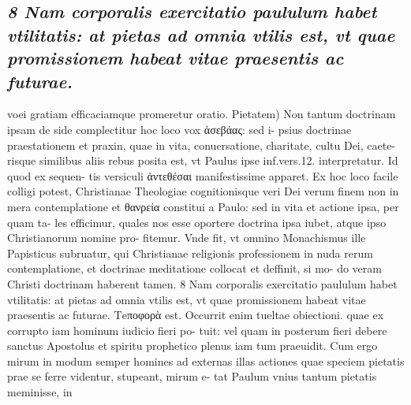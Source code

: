 \documentclass{article}
\begin{document}
\begin{pages}
\subsection*{\textit{8 Nam corporalis exercitatio paululum habet vtilitatis: at pietas ad omnia vtilis est, vt quae promissionem habeat vitae praesentis ac futurae.}}voei gratiam efficaciamque promeretur oratio. Pietatem) Non tantum doctrinam ipsam de side complectitur hoc loco vox ἀσεβάας: sed i- psius doctrinae praestationem et praxin, quae in vita, conuersatione, charitate, cultu Dei, caete- risque similibus aliis rebus posita est, vt Paulus ipse inf.vers.12. interpretatur. Id quod ex sequen- tis versiculi ἀντεθέσαι manifestissime apparet. Ex hoc loco facile colligi potest, Christianae Theologiae cognitionisque veri Dei verum finem non in mera contemplatione et θανρεία constitui a Paulo: sed in vita et actione ipsa, per quam ta- les efficimur, quales nos esse oportere doctrina ipsa iubet, atque ipso Christianorum nomine pro- fitemur. Vnde fit, vt omnino Monachismus ille Papisticus subruatur, qui Christianae religionis professionem in nuda rerum contemplatione, et doctrinae meditatione collocat et deffinit, si mo- do veram Christi doctrinam haberent tamen. 8 Nam corporalis exercitatio paululum habet vtilitatis: at pietas ad omnia vtilis est, vt quae promissionem habeat vitae praesentis ac futurae. Τeποφορὰ est. Occurrit enim tueltae obiectioni. quae ex corrupto iam hominum iudicio fieri po- tuit: vel quam in posterum fieri debere sanctus Apostolus et spiritu prophetico plenus iam tum praeuidit. Cum ergo mirum in modum semper homines ad externas illas actiones quae speciem pietatis prae se ferre videntur, stupeant, mirum e- tat Paulum vnius tantum pietatis meminisse, in  \pend

\end{pages}
\end{document}
